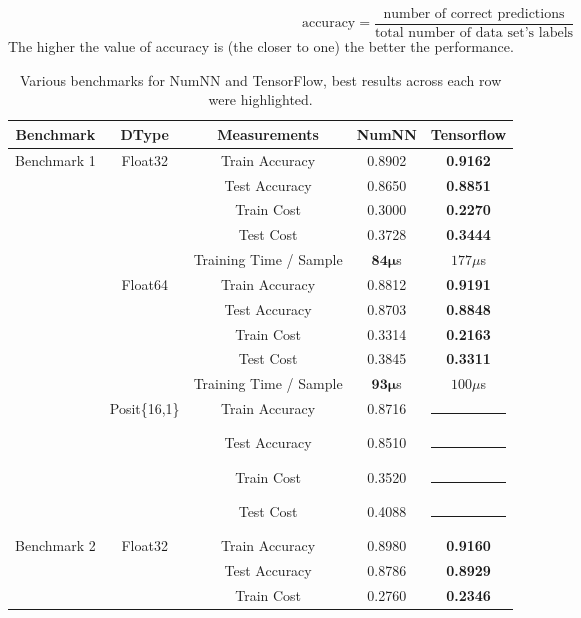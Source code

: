 \begin{equation}
\textrm{accuracy} = \frac{\textrm{number of correct predictions}}{\textrm{total number of data set's labels}}
\end{equation}\vspace{1ex} 
The higher the value of accuracy is (the closer to one) the better the performance.


\begin{table}[!hp]
	\centering
	\renewcommand{\arraystretch}{1.05}
	\caption{Various benchmarks for NumNN and TensorFlow, best results across each row were highlighted.}\label{tab:bench}
	\begin{tabular}{|c | c | c || c | c |}
		\hline
		Benchmark & DType & Measurements & NumNN & Tensorflow\\\hline\hline
		\multirow{14}{*}{Benchmark 1} & \multirow{5}{*}{Float32} & Train Accuracy & 0.8902 & \textbf{0.9162}\\
		& & Test Accuracy & 0.8650 & \textbf{0.8851}\\
		& & Train Cost & 0.3000 & \textbf{0.2270}\\
		& & Test Cost & 0.3728 & \textbf{0.3444}\\
		& & Training Time / Sample & \textbf{$\mathbf{84\mu}$}s  & $177\mu$s\\\cline{2-5}
		& \multirow{5}{*}{Float64} & Train Accuracy & 0.8812 & \textbf{0.9191} \\
		& & Test Accuracy & 0.8703 & \textbf{0.8848} \\
		& & Train Cost & 0.3314 & \textbf{0.2163} \\
		& & Test Cost & 0.3845 & \textbf{0.3311} \\
		& & Training Time / Sample & \textbf{$\mathbf{93\mu}$}s & $100\mu$s\\\cline{2-5}
		& \multirow{4}{*}{Posit\{16,1\}} & Train Accuracy & 0.8716 & \rule{5em}{1pt} \\
		& & Test Accuracy & 0.8510 & \rule{5em}{1pt} \\
		& & Train Cost & 0.3520 & \rule{5em}{1pt} \\
		& & Test Cost & 0.4088 & \rule{5em}{1pt} \\\hline
		\multirow{14}{*}{Benchmark 2%
		} & \multirow{5}{*}{Float32} & Train Accuracy & 0.8980 & \textbf{0.9160}\\
		& & Test Accuracy & 0.8786 & \textbf{0.8929}\\
		& & Train Cost & 0.2760 & \textbf{0.2346}\\

\end{tabular}
\end{table}
